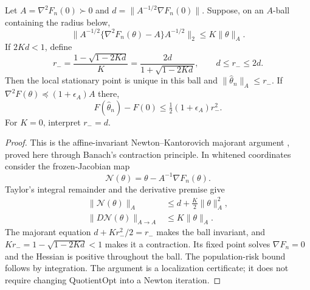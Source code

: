 \begin{proposition}
\label{prop:sharp-kantorovich}
Let $A=\nabla^2F_n(0)\succ0$ and $d=\|A^{-1/2}\nabla F_n(0)\|$.
Suppose, on an $A$-ball containing the radius below,
\begin{equation}
\|A^{-1/2}\{\nabla^2F_n(\theta)-A\}A^{-1/2}\|_2
\leq K\|\theta\|_A .
\end{equation}
If $2Kd<1$, define
\begin{equation}
r_-=\frac{1-\sqrt{1-2Kd}}{K}
=\frac{2d}{1+\sqrt{1-2Kd}},
\qquad d\leq r_-\leq2d .
\label{eq:sharp-kantorovich}
\end{equation}
Then the local stationary point is unique in this ball and
$\|\widehat\theta_n\|_A\leq r_-$.
If $\nabla^2F(\theta)\preceq(1+\epsilon_A)A$ there,
\begin{equation}
F(\widehat\theta_n)-F(0)\leq\tfrac12(1+\epsilon_A)r_-^2 .
\end{equation}
For $K=0$, interpret $r_-=d$.
\end{proposition}
\begin{proof}
This is the affine-invariant Newton--Kantorovich majorant argument
\cite{deuflhard2004newton}, proved here through Banach's contraction
principle. In whitened coordinates consider the frozen-Jacobian map
\begin{equation}
\mathcal N(\theta)=\theta-A^{-1}\nabla F_n(\theta).
\end{equation}
Taylor's integral remainder and the derivative premise give
\begin{align}
\|\mathcal N(\theta)\|_A
&\leq d+\tfrac K2\|\theta\|_A^2,\\
\|D\mathcal N(\theta)\|_{A\to A}
&\leq K\|\theta\|_A .
\end{align}
The majorant equation $d+Kr_-^2/2=r_-$ makes the ball invariant,
and $Kr_-=1-\sqrt{1-2Kd}<1$ makes it a contraction.
Its fixed point solves $\nabla F_n=0$ and the Hessian is positive
throughout the ball. The population-risk bound follows by integration.
The argument is a localization certificate; it does not require
changing QuotientOpt into a Newton iteration.
\end{proof}
